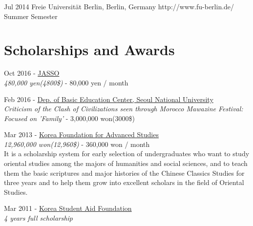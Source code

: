 \documentclass[10pt]{article} %
\begin{document}

\job
{Jul 2014}{}
{Freie Universität Berlin, Berlin, Germany}
{http://www.fu-berlin.de/}
{Summer Semester}
{
}



\if{}
\section{Scholarships and Awards}

{
Oct 2016 - \href{http://www.jasso.go.jp/ryugaku/tantosha/study_a/short_term_h/index.html}{JASSO}\\
\textit{480,000 yen(4800\$)} - 80,000 yen / month\\
}

{
Feb 2016 - \href{http://liberaleduenglish.snu.ac.kr/}{Dep. of Basic Education Center, Seoul National University}\\
\textit{Criticism of the Clash of Civilizations seen through Morocco Mawazine Festival: Focused on 'Family'} - 3,000,000 won(3000\$)\\
}

{
Mar 2013 - \href{http://www.kfas.or.kr/?pCulture=en}{Korea Foundation for Advanced Studies}\\
\textit{12,960,000 won(12,960\$)} - 360,000 won / month\\
It is a scholarship system for early selection of undergraduates who want to study oriental studies among the majors of humanities and social sciences, and to teach them the basic scriptures and major histories of the Chinese Classics Studies for three years and to help them grow into excellent scholars in the field of Oriental Studies.
}

{
Mar 2011 - \href{http://eng.kosaf.go.kr/jsp/main.jsp}{Korea Student Aid Foundation}\\
\textit{4 years full scholarship}\\
}
\fi
\end{document}
